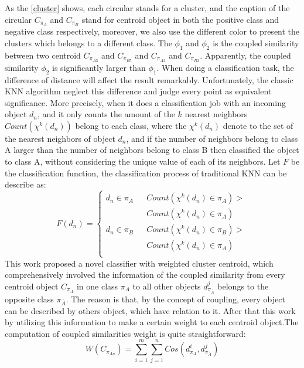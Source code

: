 \documentclass{article}
\numberwithin{equation}{section}
\begin{document}
As the \ref{cluster} shows, each circular stands for a cluster, and the caption of the circular $C_{\pi_{A}}$ and $C_{\pi_{B}}$ stand for centroid object in both the positive class and negative class respectively, moreover, we also use the different color to present the clusters which belongs to a different class. The $\phi_{1}$ and $\phi_{2}$ is the coupled similarity between two centroid $C_{\pi_{A3}}$ and $C_{\pi_{B5}}$ and $C_{\pi_{A2}}$ and $C_{\pi_{B2}}$. Apparently, the coupled similarity $\phi_{2}$ is significantly larger than $\phi_{1}$. When doing a classification task, the difference of distance will affect the result remarkably. Unfortunately, the classic KNN algorithm neglect this difference and judge every point as equivalent significance. More precisely, when it does a classification job with an incoming object $d_{n}$, and it only counts the amount of the $k$ nearest neighbors $Count(\chi^{k}(d_{n}))$ belong to each class, where the $\chi^{k}(d_{n})$ denote to the set of the nearest neighbors of object $d_{n}$, and if the number of neighbors belong to class A larger than the number of neighbors belong to class B then classified the object to class A, without considering the unique value of each of its neighbors. Let $F$ be the classification function, the classification process of traditional KNN can be describe as:
  \begin{equation}
   F(d_{n})=\left\{
\begin{aligned}
d_{n}\in \pi_{A} &    &   Count(\chi^{k}(d_n)\in\pi_{A})>\\&&Count(\chi^{k}(d_n)\in\pi_{A})\\
d_{n}\in \pi_{B} &    &   Count(\chi^{k}(d_n)\in\pi_{B})>\\&&Count(\chi^{k}(d_n)\in\pi_{A})\\
\end{aligned}
\right.
 \end{equation}
This work proposed a novel classifier with weighted cluster centroid, which comprehensively involved the information of the coupled similarity from every centroid object $C_{\pi_{A}}$ in one class $\pi_{A}$ to all other objects $d_{\pi_{\bar{A}}}^{j}$  belongs to the opposite class $\pi_{\bar{A}}$. The reason is that, by the concept of coupling, every object can be described by others object, which have relation to it. After that this work by utilizing this information to make a certain weight to each centroid object.The computation of coupled similarities weight is quite straightforward:
  \begin{equation}
   W(C_{\pi_{An}})=\sum_{i=1}^{m}\sum_{j=1}^{n}Cos(d_{\pi_{A}}^{i},d_{\pi_{\bar{A}}}^{j})
 \end{equation}
\end{document}
